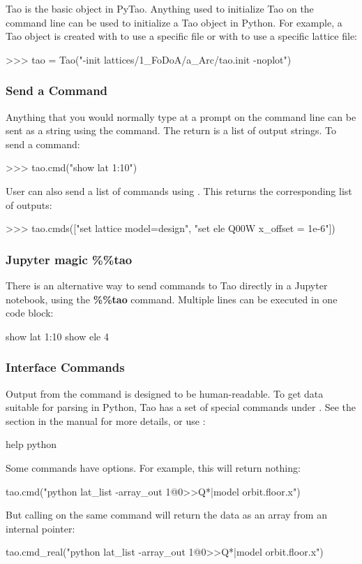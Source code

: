 \documentclass{hitec}     %
\begin{document}
{{{{Tao is the basic object in PyTao. Anything used to initialize Tao on the command line can be used to initialize a Tao object in Python. For example, a Tao object is created with  to use a specific  file or with  to use a specific lattice file:
\begin{code}
>>> tao = Tao("-init lattices/1_FoDoA/a_Arc/tao.init -noplot")
\end{code}

\subsubsection{Send a Command}
Anything that you would normally type at a  prompt on the command line can be sent as a string using the  command. The return is a list of output strings. To send a command:
\begin{code}
>>> tao.cmd("show lat 1:10")
\end{code}

User can also send a list of commands using . This returns the corresponding list of outputs:
\begin{code}
>>> tao.cmds(["set lattice model=design", "set ele Q00W x_offset = 1e-6"])
\end{code}

\subsubsection{Jupyter magic \%\%tao}
There is an alternative way to send commands to Tao directly in a Jupyter notebook, using the \textbf{\%\%tao} command. Multiple lines can be executed in one code block:
\begin{code}
show lat 1:10
show ele 4
\end{code}

\subsubsection{Interface Commands}
Output from the  command is designed to be human-readable. To get data suitable for parsing in Python, Tao has a set of special commands under . See the  section in the \tao manual for more details, or use :
\begin{code}
help python
\end{code}

Some commands have  options. For example, this will return nothing:
\begin{code}
tao.cmd("python lat_list -array_out 1@0>>Q*|model orbit.floor.x")
\end{code}
But calling  on the same command will return the data as an array from an internal pointer:
\begin{code}
tao.cmd_real("python lat_list -array_out 1@0>>Q*|model orbit.floor.x")
\end{code}

}}}}
\end{document}
